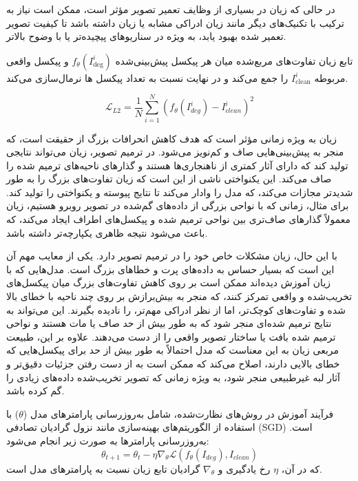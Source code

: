 در حالی که زیان  در بسیاری از وظایف تعمیر تصویر مؤثر است، ممکن است نیاز به ترکیب با تکنیک‌های دیگر مانند زیان ادراکی
مشابه 
\cite{johnsonPerceptualLossesRealTime2016}
 یا زیان  داشته باشد تا کیفیت تصویر تعمیر شده بهبود یابد، به ویژه در سناریوهای پیچیده‌تر یا با وضوح بالاتر.
 
تابع زیان  تفاوت‌های مربع‌شده میان هر پیکسل پیش‌بینی‌شده $f_{\theta}(I_{\text{deg}}^i)$ و پیکسل واقعی مربوطه $I_{\text{clean}}^i$ را جمع می‌کند و در نهایت نسبت به تعداد پیکسل ها نرمال‌سازی می‌کند. 
 
$$
\mathcal{L}_{L2} = \frac{1}{N} \sum_{i=1}^{N} (f_{\theta}(I_{deg}^i) - I_{clean}^i)^2
$$ 
 
 زیان  به ویژه زمانی مؤثر است که هدف کاهش انحرافات بزرگ از حقیقت است، که منجر به پیش‌بینی‌هایی صاف و کم‌نویز می‌شود. در ترمیم تصویر، زیان  می‌تواند نتایجی تولید کند که دارای آثار کمتری از ناهنجاری‌ها هستند و گذارهای ناحیه‌های ترمیم شده را صاف می‌کند. این یکنواختی ناشی از این است که زیان  تفاوت‌های بزرگ را به طور شدیدتر مجازات می‌کند، که مدل را وادار می‌کند تا نتایج پیوسته و یکنواختی را تولید کند. برای مثال، زمانی که با نواحی بزرگی از داده‌های گم‌شده در تصویر روبرو هستیم، زیان  معمولاً گذارهای صاف‌تری بین نواحی ترمیم شده و پیکسل‌های اطراف ایجاد می‌کند، که باعث می‌شود نتیجه ظاهری یکپارچه‌تر داشته باشد.
 
 با این حال، زیان  مشکلات خاص خود را در ترمیم تصویر دارد. یکی از معایب مهم آن این است که بسیار حساس به داده‌های پرت و خطاهای بزرگ است. مدل‌هایی که با زیان  آموزش دیده‌اند ممکن است بر روی کاهش تفاوت‌های بزرگ میان پیکسل‌های تخریب‌شده و واقعی تمرکز کنند، که منجر به بیش‌برازش
بر روی چند ناحیه با خطای بالا شده و تفاوت‌های کوچک‌تر، اما از نظر ادراکی مهم‌تر، را نادیده بگیرند. این می‌تواند به نتایج ترمیم شده‌ای منجر شود که به طور بیش از حد صاف یا مات هستند و نواحی ترمیم شده بافت یا ساختار تصویر واقعی را از دست می‌دهند. علاوه بر این، طبیعت مربعی زیان  به این معناست که مدل احتمالاً به طور بیش از حد برای پیکسل‌هایی که خطای بالایی دارند، اصلاح می‌کند که ممکن است به از دست رفتن جزئیات دقیق‌تر و آثار لبه غیرطبیعی منجر شود، به ویژه زمانی که تصویر تخریب‌شده داده‌های زیادی را گم کرده باشد.
 

فرآیند آموزش در روش‌های نظارت‌شده، شامل به‌روزرسانی پارامترهای مدل (\(\theta\)) با استفاده از الگوریتم‌های بهینه‌سازی مانند نزول گرادیان تصادفی (SGD) است. به‌روزرسانی پارامترها به صورت زیر انجام می‌شود:  
$$
\theta_{t+1} = \theta_t - \eta \nabla_{\theta} \mathcal{L}(f_{\theta}(I_{deg}), I_{clean})
$$
که در آن، $\eta$ رخ یادگیری و 
$ \nabla_{\theta} $
گرادیان تابع زیان نسبت به پارامترهای مدل است.  


